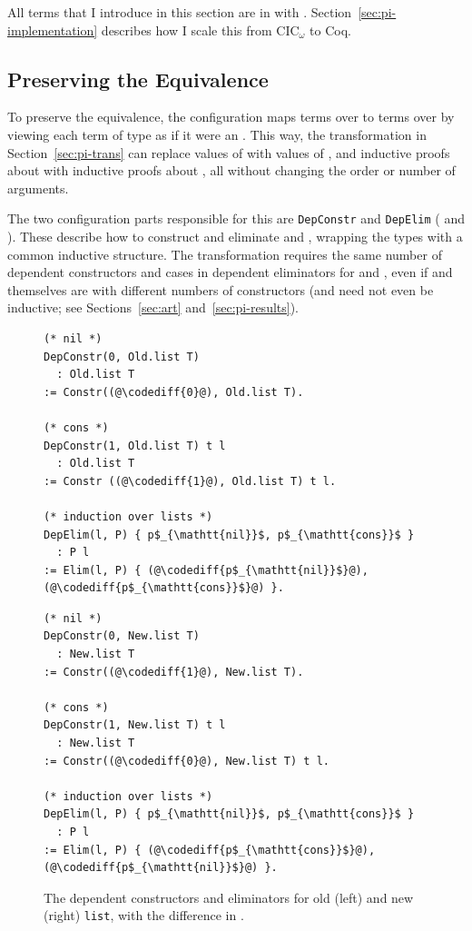 All terms that I introduce in this section are in  with . %
Section~\ref{sec:pi-implementation} describes how I scale this from CIC$_{\omega}$ to Coq.

\subsection{Preserving the Equivalence}
\label{sec:pi-diff-equiv}

To preserve the equivalence, the configuration maps terms over \Aa to terms over \B by viewing each
term of type \B as if it were an \Aa.
This way, the transformation in Section~\ref{sec:pi-trans} can replace values of \Aa with values of \B, and
inductive proofs about \Aa with inductive proofs about \B, %
all without changing the order or number of arguments.

The two configuration parts responsible for this are \lstinline{DepConstr}
and \lstinline{DepElim} ( and ).
These describe how to construct and eliminate \Aa and \B, wrapping the types with a common inductive structure.
The transformation requires the same number of dependent constructors and cases in dependent eliminators for \Aa and \B,
even if \Aa and \B themselves are  with different numbers of constructors
(\Aa and \B need not even be inductive; see Sections~\ref{sec:art} and~\ref{sec:pi-results}).

\begin{figure}
\begin{minipage}{0.49\textwidth}
\begin{lstlisting}
(* nil *)
DepConstr(0, Old.list T)
  : Old.list T
:= Constr((@\codediff{0}@), Old.list T).

(* cons *)
DepConstr(1, Old.list T) t l
  : Old.list T
:= Constr ((@\codediff{1}@), Old.list T) t l.

(* induction over lists *)
DepElim(l, P) { p$_{\mathtt{nil}}$, p$_{\mathtt{cons}}$ }
  : P l
:= Elim(l, P) { (@\codediff{p$_{\mathtt{nil}}$}@), (@\codediff{p$_{\mathtt{cons}}$}@) }.
\end{lstlisting}
\end{minipage}
\hfill
\begin{minipage}{0.49\textwidth}
\begin{lstlisting}
(* nil *)
DepConstr(0, New.list T)
  : New.list T
:= Constr((@\codediff{1}@), New.list T).

(* cons *)
DepConstr(1, New.list T) t l
  : New.list T
:= Constr((@\codediff{0}@), New.list T) t l.

(* induction over lists *)
DepElim(l, P) { p$_{\mathtt{nil}}$, p$_{\mathtt{cons}}$ }
  : P l
:= Elim(l, P) { (@\codediff{p$_{\mathtt{cons}}$}@), (@\codediff{p$_{\mathtt{nil}}$}@) }.
\end{lstlisting}
\end{minipage}
\caption{The dependent constructors and eliminators for old (left) and new (right) \lstinline{list}, with the difference in .}
\label{fig:listconfig}
\end{figure}

